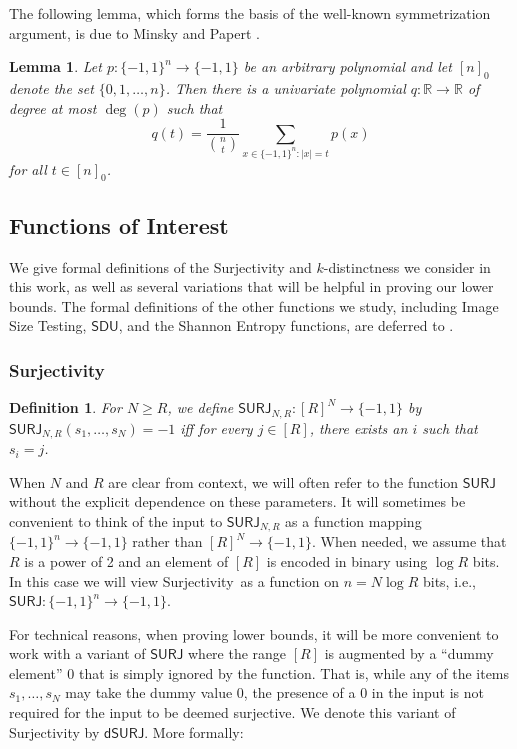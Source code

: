 \documentclass[11pt, letterpaper, fleqn]{article}
\newtheorem{definition}[theorem]{Definition}
\newtheorem{lemma}[theorem]{Lemma}
\theoremstyle{plain}
\newcommand{\R}{\mathbb{R}}
\newcommand{\SURJ}{\mathsf{ SURJ}}
\newcommand{\SDU}{\mathsf{ SDU}}
\newcommand{\Surjectivity}{Surjectivity}
\newcommand{\dumSURJ}{\mathsf{dSURJ}}
\newcommand{\bits}{\{-1,1\}}
\begin{document}
The following lemma, which forms the basis of the well-known symmetrization argument, is due to Minsky and Papert \cite{mp}. 
\begin{lemma} \label{lem:mp}
Let $p \colon \bits^n \to \bits$ be an arbitrary polynomial and let $[n]_0$
denote the set $\{0, 1, \dots, n\}$. Then
there is a univariate polynomial $q \colon \R \to \R$ of degree at most $\deg(p)$
such that 
\[q(t) = \frac{1}{\binom{n}{ t}} \sum_{x \in \bits^n \colon |x|=t} p(x)\]
for all $t \in [n]_0$.
\end{lemma}

\subsection{Functions of Interest}
\label{sec:functions}
We give formal definitions of the Surjectivity and $k$-distinctness we consider in this work, as well as several variations that will be helpful in proving our lower bounds. The formal definitions of the other functions we study, including Image Size Testing, $\SDU$, and the Shannon Entropy functions, are deferred to .

\subsubsection{Surjectivity}


\begin{definition}\label{def:surj}
For $N \ge R$, we define $\SURJ_{N, R} : [R]^N \to \bits$ by $\SURJ_{N, R}(s_1, \dots, s_N) = -1$ iff for every $j \in [R]$, there exists an $i$ such that $s_i = j$.
\end{definition}

When $N$ and $R$ are clear from context, we will often refer to the function $\SURJ$ without the explicit dependence on these parameters. It will sometimes be convenient to think of the input to $\SURJ_{N, R}$ as a function
mapping $\bits^n \to \bits$ rather than $[R]^N \to \bits$. 
When needed, we assume that $R$ is a power of 2 and an element of $[R]$ is encoded in binary using $\log R$ bits.
In this case we will view \Surjectivity\ as a function on $n=N\log R$ bits, i.e.,  $\SURJ: \bits^{n} \to \bits$.

For technical reasons, when proving lower bounds, it will be more convenient to work with a variant of $\SURJ$ where the range $[R]$ is augmented by a ``dummy element'' $0$ that is simply ignored by the function. That is, while any of the items $s_1, \dots, s_N$ may take the dummy value $0$, the presence of a $0$ in the input is not required for the input to be deemed surjective. We denote this variant of Surjectivity by $\dumSURJ$. More formally:
\end{document}
